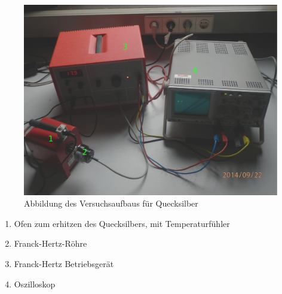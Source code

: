 \documentclass[12pt,a4paper]{article}
\begin{document}
\begin{figure}[H] 
  \centering
    \includegraphics[scale = 0.3]{aufbau_q.pdf}
  	\caption[Abbildung des Versuchsaufbaus für Quecksilber]{Abbildung des Versuchsaufbaus für Quecksilber}
  \label{fig:abb_versuch_3}
\end{figure}

\begin{enumerate}
\item	Ofen zum erhitzen des Quecksilbers, mit Temperaturfühler

\item	Franck-Hertz-Röhre

\item	Franck-Hertz Betriebsgerät

\item	Oszilloskop
\end{enumerate}
\end{document}
